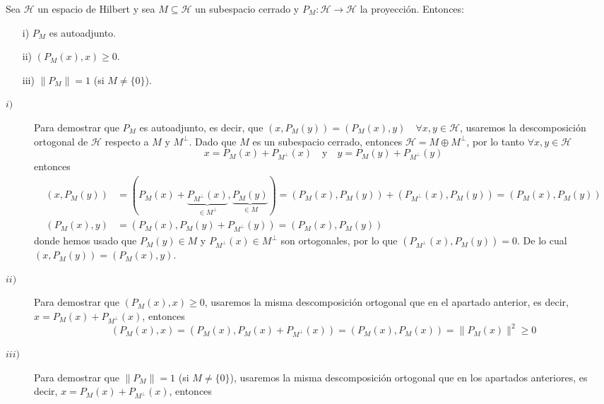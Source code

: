\begin{ejercicio}
    Sea $\mathcal{H}$ un espacio de Hilbert y sea $M \subseteq \mathcal{H}$ un subespacio cerrado y $P_M: \mathcal{H} \to \mathcal{H}$ la proyección. Entonces:
    \begin{itemize}
        \item[i)] $P_M$ es autoadjunto.
        \item[ii)] $(P_M(x), x) \ge 0$.
        \item[iii)] $\|P_M\| = 1$ (si $M \neq \{0\}$).
    \end{itemize}
    \begin{description}
        \item[$i)$] Para demostrar que $P_M$ es autoadjunto, es decir, que $(x, P_M(y)) = (P_M(x), y) \quad \forall x, y \in \mathcal{H}$, usaremos la descomposición ortogonal de $\mathcal{H}$ respecto a $M$ y $M^\perp$. Dado que $M$ es un subespacio cerrado, entonces $\mathcal{H} = M \oplus M^\perp$, por lo tanto $\forall x, y \in \mathcal{H}$
        \begin{equation*}
            x = P_M(x) + P_{M^\perp}(x) \quad \text{y} \quad y = P_M(y) + P_{M^\perp}(y)
        \end{equation*}
        entonces
        \begin{align*}
            (x, P_M(y)) &= (P_M(x) + \underbrace{P_{M^\perp}(x)}_{\in M^\perp}, \underbrace{P_M(y)}_{\in M}) = (P_M(x), P_M(y))+(P_{M^\perp}(x), P_M(y))= (P_M(x), P_M(y))\\
            (P_M(x), y) &= (P_M(x), P_M(y) + P_{M^\perp}(y)) = (P_M(x), P_M(y)) 
        \end{align*}
        donde hemos usado que $P_M(y) \in M$ y $P_{M^\perp}(x) \in M^\perp$ son ortogonales, por lo que $(P_{M^\perp}(x), P_M(y)) = 0$. De lo cual $(x, P_M(y)) = (P_M(x), y)$.
        \item[$ii)$] Para demostrar que $(P_M(x), x) \ge 0$, usaremos la misma descomposición ortogonal que en el apartado anterior, es decir, $x = P_M(x) + P_{M^\perp}(x)$, entonces
        \begin{equation*}
            (P_M(x), x) = (P_M(x), P_M(x) + P_{M^\perp}(x)) = (P_M(x), P_M(x)) = \|P_M(x)\|^2 \ge 0
        \end{equation*}
        \item[$iii)$] Para demostrar que $\|P_M\| = 1$ (si $M \neq \{0\}$), usaremos la misma descomposición ortogonal que en los apartados anteriores, es decir, $x = P_M(x) + P_{M^\perp}(x)$, entonces
        \begin{equation*}

\end{equation*}
\end{description}
\end{ejercicio}
